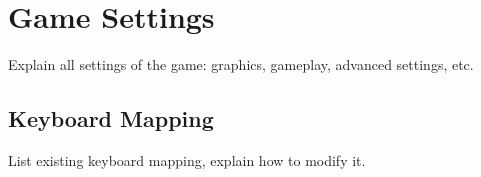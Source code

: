 \chapter{Game Settings}
Explain all settings of the game: graphics, gameplay, advanced settings, etc.

\section{Keyboard Mapping}
List existing keyboard mapping, explain how to modify it.

